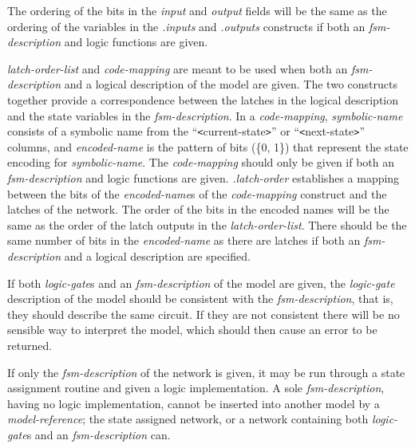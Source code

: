 {\begin{pespace}
The ordering of the bits in the {\em input} and {\em output} fields will be
the same as the ordering of the variables in the {\em .inputs} and {\em
.outputs} constructs if both an {\em fsm-description} and logic functions
are given. 

{\em latch-order-list} and {\em code-mapping} are meant to be used when both
an {\em fsm-description} and a logical description of the model are given.
The two constructs together provide a correspondence between the latches in
the logical description and the state variables in the {\em
fsm-description}.  In a {\em code-mapping}, {\em symbolic-name} consists of
a symbolic name from the ``{\verb|<|}current-state{\verb|>|}'' or
``{\verb|<|}next-state{\verb|>|}'' columns, and {\em encoded-name} is the
pattern of bits (\{0, 1\}) that represent the state encoding for {\em
symbolic-name}.  The {\em code-mapping} should only be given if both an {\em
fsm-description} and logic functions are given.  {\em .latch-order}
establishes a mapping between the bits of the {\em encoded-name}s of the
{\em code-mapping} construct and the latches of the network.  The order of
the bits in the encoded names will be the same as the order of the latch
outputs in the {\em latch-order-list}.  There should be the same number of
bits in the {\em encoded-name} as there are latches if both an {\em
fsm-description} and a logical description are specified.

If both {\em logic-gate}s and an {\em fsm-description} of the model are
given, the {\em logic-gate} description of the model should be consistent
with the {\em fsm-description}, that is, they should describe the same
circuit.  If they are not consistent there will be no sensible way to
interpret the model, which should then cause an error to be returned.

If only the {\em fsm-description} of the network is given, it may be run
through a state assignment routine and given a logic implementation.  A sole
{\em fsm-description}, having no logic implementation, cannot be inserted
into another model by a {\em model-reference}; the state assigned network,
or a network containing both {\em logic-gate}s and an {\em fsm-description}
can.


\end{pespace}}
